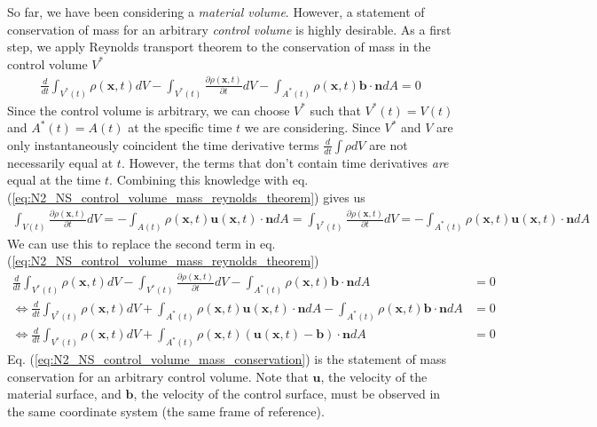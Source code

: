 \documentclass[a4paper, 12pt]{article}
\numberwithin{equation}{subsubsection}
\begin{document}
So far, we have been considering a \textit{material volume}. However, a statement of conservation of mass for an arbitrary \textit{control volume} is highly desirable. As a first step, we apply Reynolds transport theorem to the conservation of mass in the control volume $V^*$
\begin{align}
	\frac{d}{dt} \int_{V^*(t)} \rho(\mathbf{x}, t) dV - \int_{V^*(t)} \frac{\partial \rho(\mathbf{x}, t)}{\partial t} d V - \int_{A^*(t)} \rho(\mathbf{x}, t) \mathbf{b} \cdot \mathbf{n} dA = 0 \label{eq:N2_NS_control_volume_mass_reynolds_theorem}
\end{align}
Since the control volume is arbitrary, we can choose $V^*$ such that $V^*(t) = V(t)$ and $A^*(t) = A(t)$ at the specific time $t$ we are considering. Since $V^*$ and $V$ are only instantaneously coincident the time derivative terms $\frac{d}{dt} \int \rho dV$ are not necessarily equal at $t$. However, the terms that don't contain time derivatives \textit{are} equal at the time $t$. Combining this knowledge with eq. (\ref{eq:N2_NS_control_volume_mass_reynolds_theorem}) gives us
\begin{align}
	\int_{V(t)} \frac{\partial \rho(\mathbf{x}, t)}{\partial t} d V = - \int_{A(t)} \rho(\mathbf{x}, t) \mathbf{u}(\mathbf{x}, t) \cdot \mathbf{n} dA = \int_{V^*(t)} \frac{\partial \rho(\mathbf{x}, t)}{\partial t} d V = - \int_{A^*(t)} \rho(\mathbf{x}, t) \mathbf{u}(\mathbf{x}, t) \cdot \mathbf{n} dA
\end{align}
We can use this to replace the second term in eq. (\ref{eq:N2_NS_control_volume_mass_reynolds_theorem})
\begin{align}
	\frac{d}{dt} \int_{V^*(t)} \rho(\mathbf{x}, t) dV - \int_{V^*(t)} \frac{\partial \rho(\mathbf{x}, t)}{\partial t} d V - \int_{A^*(t)} \rho(\mathbf{x}, t) \mathbf{b} \cdot \mathbf{n} dA &= 0\\
	\Leftrightarrow \frac{d}{dt} \int_{V^*(t)} \rho(\mathbf{x}, t) dV + \int_{A^*(t)} \rho(\mathbf{x}, t) \mathbf{u}(\mathbf{x}, t) \cdot \mathbf{n} dA - \int_{A^*(t)} \rho(\mathbf{x}, t) \mathbf{b} \cdot \mathbf{n} dA &= 0 \\
	\Leftrightarrow \frac{d}{dt} \int_{V^*(t)} \rho(\mathbf{x}, t) dV + \int_{A^*(t)} \rho(\mathbf{x}, t) (\mathbf{u}(\mathbf{x}, t) - \mathbf{b}) \cdot \mathbf{n} dA &= 0 \label{eq:N2_NS_control_volume_mass_conservation}
\end{align}
Eq. (\ref{eq:N2_NS_control_volume_mass_conservation}) is the statement of mass conservation for an arbitrary control volume. Note that $\mathbf{u}$, the velocity of the material surface, and $\mathbf{b}$, the velocity of the control surface, must be observed in the same coordinate system (the same frame of reference).
\end{document}
